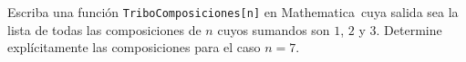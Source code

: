 Escriba una función \texttt{TriboComposiciones[n]} en Mathematica\textregistered\ cuya salida sea la lista de todas las composiciones de \(n\) cuyos sumandos son \(1\), \(2\) y \(3\). Determine explícitamente las composiciones para el caso \(n=7\).
